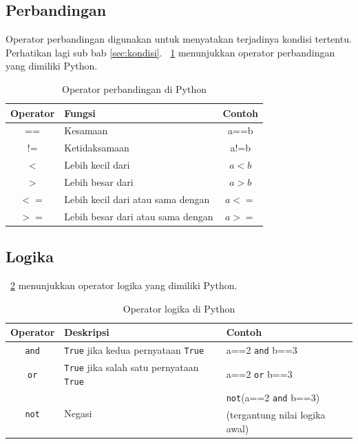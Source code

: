 \subsection{Perbandingan}
Operator perbandingan digunakan untuk menyatakan terjadinya kondisi tertentu. Perhatikan lagi sub bab \ref{sec:kondisi}. \tablename~\ref{tab:perbandingan} menunjukkan operator perbandingan yang dimiliki Python. 

\begin{table}[h]
\caption{Operator perbandingan di Python}
\label{tab:perbandingan}
  \begin{center}
    \begin{tabular}{@{}clc@{}}\toprule
    Operator & Fungsi  & Contoh\\ \midrule
    == & Kesamaan & a==b \\
    != & Ketidaksamaan & a!=b \\
    $<$ & Lebih kecil dari & $a<b$ \\
    $>$ & Lebih besar dari & $a>b$ \\
    $<=$ & Lebih kecil dari atau sama dengan & $a<=$ \\
    $>=$ & Lebih besar dari atau sama dengan & $a>=$ \\
       \bottomrule
    \end{tabular}
  \end{center}
\end{table}

\subsection{Logika}
\tablename~\ref{tab:logika} menunjukkan operator logika yang dimiliki Python.

\begin{table}[h]
\caption{Operator logika di Python}
\label{tab:logika}
  \begin{center}
    \begin{tabular}{@{}cll@{}}\toprule
    Operator & Deskripsi  & Contoh\\ \midrule
    \texttt{and} & \texttt{True} jika kedua pernyataan \texttt{True} & a==2 \texttt{and} b==3 \\
    \texttt{or} & \texttt{True} jika salah satu pernyataan \texttt{True} & a==2 \texttt{or} b==3 \\
    \multirow{2}{*}{\texttt{not}} & \multirow{2}{*}{Negasi} & \texttt{not}(a==2 \texttt{and} b==3) \\
     & & (tergantung nilai logika awal) \\
       \bottomrule
    \end{tabular}
  \end{center}
\end{table}

